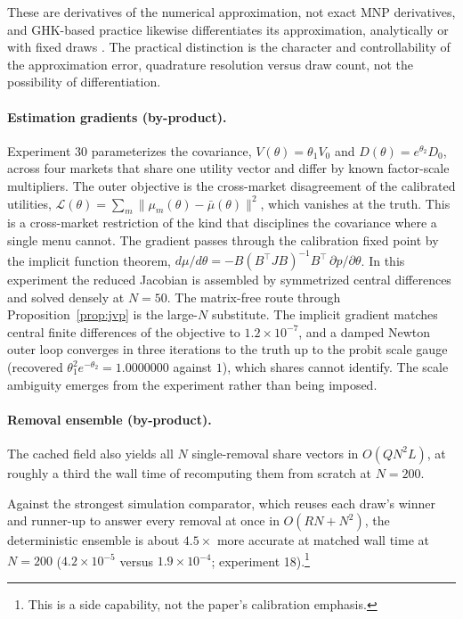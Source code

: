 \documentclass[12pt]{article}
\theoremstyle{remark}
\begin{document}
These are derivatives of the numerical
approximation, not exact MNP derivatives, and GHK-based practice likewise
differentiates its approximation, analytically or with fixed draws
\citep{hmr1996,hajivassiliou1998,train2009}. The practical distinction is the character and controllability of the
approximation error, quadrature resolution versus draw count, not the
possibility of differentiation.

\paragraph{Estimation gradients (by-product).} Experiment 30
parameterizes the covariance, $V(\theta) = \theta_1 V_0$ and
$D(\theta) = e^{\theta_2} D_0$, across four markets that share one
utility vector and differ by known factor-scale multipliers. The outer
objective is the cross-market disagreement of the calibrated utilities,
$\mathcal{L}(\theta) = \sum_m \|\mu_m(\theta) - \bar\mu(\theta)\|^2$, which
vanishes at the truth. This is a cross-market restriction of the kind
that disciplines the covariance where a single menu cannot. The
gradient passes through the calibration fixed point by the implicit
function theorem, $d\mu/d\theta = -B(B^\top J B)^{-1}B^\top\,
\partial p/\partial\theta$. In this experiment the reduced Jacobian is
assembled by symmetrized central differences and solved densely at
$N = 50$. The matrix-free route through Proposition~\ref{prop:jvp} is
the large-$N$ substitute. The implicit gradient matches central finite
differences of the objective to $1.2\times10^{-7}$, and a damped Newton
outer loop converges in three iterations to the truth up to the probit
scale gauge (recovered $\theta_1^2 e^{-\theta_2} = 1.0000000$ against
$1$), which shares cannot identify. The scale ambiguity emerges from
the experiment rather than being imposed.

\paragraph{Removal ensemble (by-product).} The cached field also yields
all $N$ single-removal share vectors in $O(QN^2L)$, at roughly a third
the wall time of recomputing them from scratch at $N=200$.

Against the strongest simulation comparator, which reuses each draw's
winner and runner-up to answer every removal at once in $O(RN + N^2)$, the
deterministic ensemble is about $4.5\times$ more accurate at matched wall
time at $N=200$ ($4.2\times10^{-5}$ versus $1.9\times10^{-4}$;
experiment 18).\footnote{This is a side capability, not the paper's calibration emphasis.}
\end{document}
